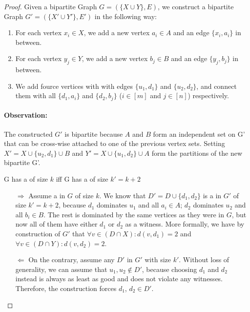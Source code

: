 \begin{proof}
    Given a bipartite Graph $G = ( \{X \cup Y\}, E)$, we construct a bipartite Graph $G' = (\{X' \cup Y'\},E')$ in the following way:
    \begin{enumerate}
        \item For each vertex $x_i \in X$, we add a new vertex $a_i \in A$  and an edge $\{x_i, a_i\}$ in between. 
        \item For each vertex $y_j \in Y$, we add a new vertex $b_j \in B$ and an edge $\{y_j, b_j\}$ in between.
        \item We add fource vertices with with edges $\{u_1, d_1\}$ and $\{u_2, d_2\}$, and connect them with all $\{d_1, a_i\}$ and $\{d_2, b_j\}$ ($i \in [m]$ and $j \in [n]$) respectively.
    \end{enumerate}
    \paragraph*{Observation:} The constructed $G'$ is bipartite because $A$ and $B$ form an independent set on G' that can be cross-wise attached to one of the previous vertex sets. Setting  $X' = X \cup \{u_2,d_1\} \cup B$ and $Y' = X \cup \{u_1,d_2\} \cup A$ form the partitions of the new bipartite G'.

    \begin{corollary} G has a \dom of size $k$ iff G has a \sdom of size $k' = k + 2$
    \end{corollary} 
    \begin{enumerate}
    \item[$\Rightarrow$] Assume a \dom in $G$ of size $k$. We know that $D' = D\cup \{d_1,d_2\}$ is a \sdom in $G'$ of size $k' = k + 2$, because $d_1$ dominates $u_1$ and all $a_i \in A$; $d_2$ dominates $u_2$ and all $b_i \in B$. The rest is dominated by the same vertices as they were in $G$, but now all of them have either $d_1$ or $d_2$ as a witness.
    More formally, we have by construction of $G'$ that $\forall v \in (D \cap X): d(v, d_1) = 2$ and $\forall v \in (D \cap Y): d(v, d_2) = 2$.

    \item[$\Leftarrow$] On the contrary, assume any \sdom $D'$ in $G'$ with size $k'$. Without loss of generality, we can assume that $u_1, u_2 \notin D'$, because choosing $d_1$ and $d_2$ instead is always as least as good and does not violate any witnesses. Therefore, the construction forces $d_1$, $d_2 \in D'$. 


\end{enumerate}
\end{proof}
